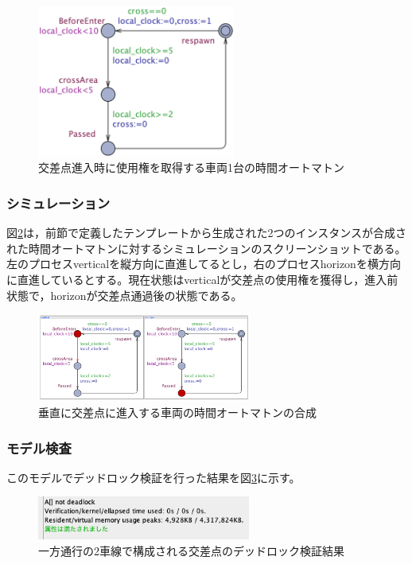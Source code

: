 \documentclass[twocolumn,10pt]{jsarticle}
\begin{document}
	\begin{figure}[htbp]
	\centering
	\includegraphics[width=65mm]{Perpendicular.png}
	\caption{交差点進入時に使用権を取得する車両1台の時間オートマトン}
	\label{Perpendicular}
	\end{figure}
	
	\subsubsection{シミュレーション}
	
	図\ref{PerpendicularS}は，前節で定義したテンプレートから生成された2つのインスタンスが合成された時間オートマトンに対するシミュレーションのスクリーンショットである。左のプロセスverticalを縦方向に直進してるとし，右のプロセスhorizonを横方向に直進しているとする。現在状態はverticalが交差点の使用権を獲得し，進入前状態で，horizonが交差点通過後の状態である。
	\begin{figure}[htbp]
	\centering
	\includegraphics[width=70mm]{PerpendicularSimu.png}
	\caption{垂直に交差点に進入する車両の時間オートマトンの合成}
	\label{PerpendicularS}
	\end{figure}
	
	\subsubsection{モデル検査}
	このモデルでデッドロック検証を行った結果を図\ref{PerV}に示す。
	\begin{figure}[htbp]
	\centering
	\includegraphics[width=70mm]{PerV.png}
	\caption{一方通行の2車線で構成される交差点のデッドロック検証結果}
	\label{PerV}
	\end{figure}
	
\end{document}

